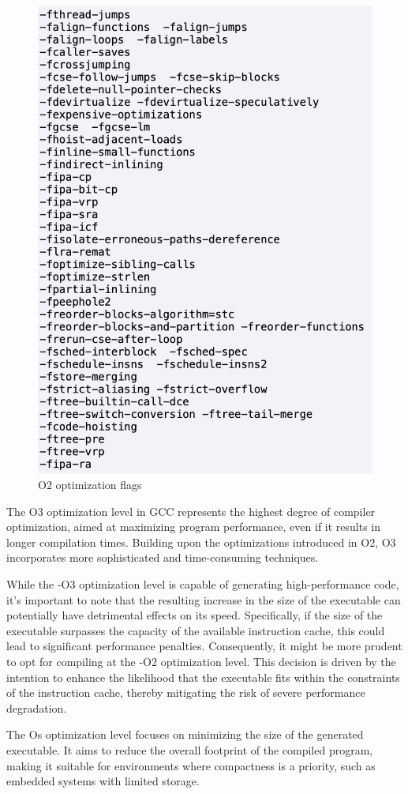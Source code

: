 \documentclass[conference]{IEEEtran}
\begin{document}
\begin{figure}[htbp]
\centering
\includegraphics [width=0.7\linewidth]{pictures/o2.png}
\caption{O2 optimization flags\cite{b2}}
\label{fig}
\end{figure}

The O3 optimization level in GCC represents the highest degree of compiler optimization, aimed at maximizing program performance, even if it results in longer compilation times. Building upon the optimizations introduced in O2, O3 incorporates more sophisticated and time-consuming techniques.

While the -O3 optimization level is capable of generating high-performance code, it's important to note that the resulting increase in the size of the executable can potentially have detrimental effects on its speed. Specifically, if the size of the executable surpasses the capacity of the available instruction cache, this could lead to significant performance penalties. Consequently, it might be more prudent to opt for compiling at the -O2 optimization level. This decision is driven by the intention to enhance the likelihood that the executable fits within the constraints of the instruction cache, thereby mitigating the risk of severe performance degradation.

The Os optimization level focuses on minimizing the size of the generated executable. It aims to reduce the overall footprint of the compiled program, making it suitable for environments where compactness is a priority, such as embedded systems with limited storage.
\end{document}
